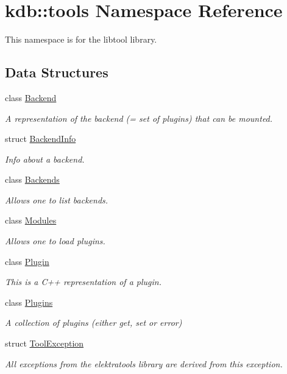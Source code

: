 \hypertarget{namespacekdb_1_1tools}{\section{kdb\+:\+:tools Namespace Reference}
\label{namespacekdb_1_1tools}
}


This namespace is for the libtool library.  


\subsection*{Data Structures}
\begin{DoxyCompactItemize}
\item 
class \hyperlink{classkdb_1_1tools_1_1Backend}{Backend}
\begin{DoxyCompactList}\small\item\em A representation of the backend (= set of plugins) that can be mounted. \end{DoxyCompactList}\item 
struct \hyperlink{structkdb_1_1tools_1_1BackendInfo}{Backend\+Info}
\begin{DoxyCompactList}\small\item\em Info about a backend. \end{DoxyCompactList}\item 
class \hyperlink{classkdb_1_1tools_1_1Backends}{Backends}
\begin{DoxyCompactList}\small\item\em Allows one to list backends. \end{DoxyCompactList}\item 
class \hyperlink{classkdb_1_1tools_1_1Modules}{Modules}
\begin{DoxyCompactList}\small\item\em Allows one to load plugins. \end{DoxyCompactList}\item 
class \hyperlink{classkdb_1_1tools_1_1Plugin}{Plugin}
\begin{DoxyCompactList}\small\item\em This is a C++ representation of a plugin. \end{DoxyCompactList}\item 
class \hyperlink{classkdb_1_1tools_1_1Plugins}{Plugins}
\begin{DoxyCompactList}\small\item\em A collection of plugins (either get, set or error) \end{DoxyCompactList}\item 
struct \hyperlink{structkdb_1_1tools_1_1ToolException}{Tool\+Exception}
\begin{DoxyCompactList}\small\item\em All exceptions from the elektratools library are derived from this exception. \end{DoxyCompactList}\end{DoxyCompactItemize}
